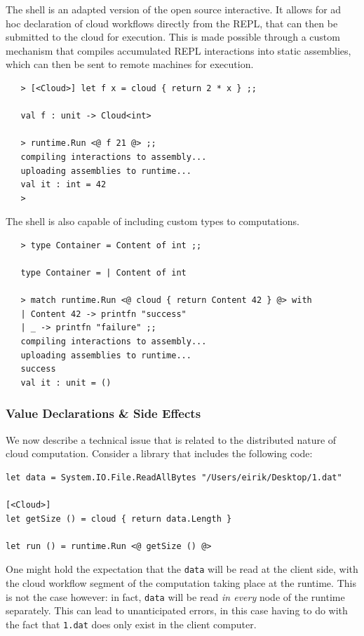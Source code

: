 The \mbrace{} shell is an adapted version of the open source \fsharp{} interactive.
It allows for ad hoc declaration of cloud workflows directly from the REPL, that
can then be submitted to the cloud for execution. This is made possible through
a custom mechanism that compiles accumulated REPL interactions into static assemblies,
which can then be sent to remote machines for execution.
\begin{verbatim}
   > [<Cloud>] let f x = cloud { return 2 * x } ;;

   val f : unit -> Cloud<int>

   > runtime.Run <@ f 21 @> ;;
   compiling interactions to assembly... 
   uploading assemblies to runtime... 
   val it : int = 42
   >
\end{verbatim}
The \mbrace{} shell is also capable of including custom types to computations.
\begin{verbatim}
   > type Container = Content of int ;;

   type Container = | Content of int

   > match runtime.Run <@ cloud { return Content 42 } @> with
   | Content 42 -> printfn "success"
   | _ -> printfn "failure" ;;
   compiling interactions to assembly... 
   uploading assemblies to runtime... 
   success
   val it : unit = ()
\end{verbatim}


\subsubsection*{Value Declarations \& Side Effects}

We now describe a technical issue that is related to the distributed nature of cloud computation.
Consider a library that includes the following code:
\begin{lstlisting}
let data = System.IO.File.ReadAllBytes "/Users/eirik/Desktop/1.dat"

[<Cloud>]
let getSize () = cloud { return data.Length }

let run () = runtime.Run <@ getSize () @>
\end{lstlisting}
One might hold the expectation that the \texttt{data} will be read at the client side,
with the cloud workflow segment of the computation taking place at the runtime.
This is not the case however: in fact, \texttt{data} will be read \emph{in every}
node of the runtime separately. This can lead to unanticipated errors, in this case
having to do with the fact that \texttt{1.dat} does only exist in the client computer.

